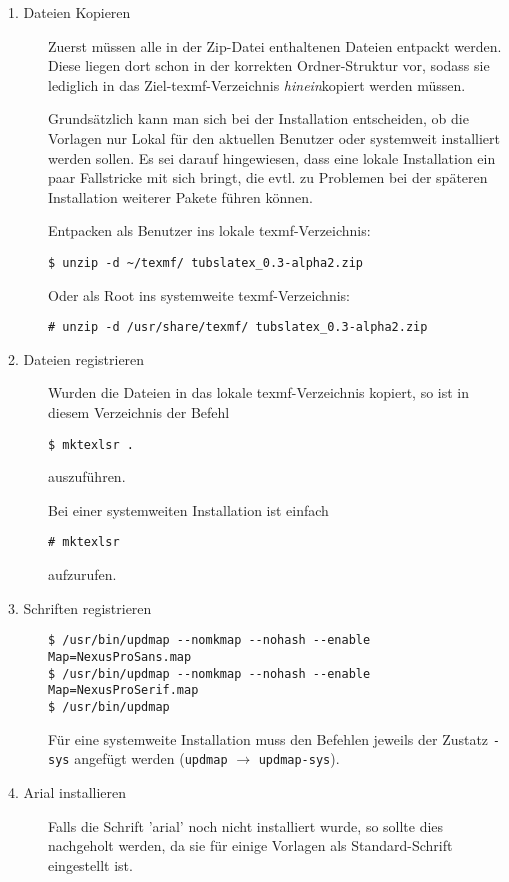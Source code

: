 \begin{description}
  \item[1. Dateien Kopieren] Zuerst müssen alle in der Zip-Datei enthaltenen
    Dateien entpackt werden.
    Diese liegen dort schon in der korrekten Ordner-Struktur vor, sodass
    sie lediglich in das Ziel-texmf-Verzeichnis \emph{hinein}kopiert werden
    müssen.
    
    Grundsätzlich kann man sich bei der Installation entscheiden,
    ob die Vorlagen nur Lokal für den aktuellen Benutzer oder systemweit
    installiert werden sollen.
    Es sei darauf hingewiesen, dass eine lokale Installation ein paar
    Fallstricke mit sich bringt, die evtl. zu Problemen bei der späteren
    Installation weiterer Pakete führen können.
    
    Entpacken als Benutzer ins lokale texmf-Verzeichnis:
    \begin{lstlisting}
$ unzip -d ~/texmf/ tubslatex_0.3-alpha2.zip
    \end{lstlisting}
    Oder als Root ins systemweite texmf-Verzeichnis:
    \begin{lstlisting}
# unzip -d /usr/share/texmf/ tubslatex_0.3-alpha2.zip
    \end{lstlisting}
  \item[2. Dateien registrieren]
    Wurden die Dateien in das lokale texmf-Verzeichnis kopiert, so ist
    in diesem Verzeichnis der Befehl
    \begin{lstlisting}
$ mktexlsr .
    \end{lstlisting}
    auszuführen.

    Bei einer systemweiten Installation ist einfach
    \begin{lstlisting}
# mktexlsr
    \end{lstlisting}
    aufzurufen.

  \item[3. Schriften registrieren]\hfill

    \begin{lstlisting}
$ /usr/bin/updmap --nomkmap --nohash --enable Map=NexusProSans.map
$ /usr/bin/updmap --nomkmap --nohash --enable Map=NexusProSerif.map
$ /usr/bin/updmap
    \end{lstlisting}
    
    Für eine systemweite Installation muss den Befehlen jeweils der Zustatz
    \texttt{-sys} angefügt werden (\lstinline{updmap} $\to$ \lstinline{updmap-sys}).
  
  \item[4. Arial installieren]\hfill
    Falls die Schrift 'arial' noch nicht installiert wurde, so sollte dies
    nachgeholt werden, da sie für einige Vorlagen als Standard-Schrift
    eingestellt ist.
    

\end{description}
